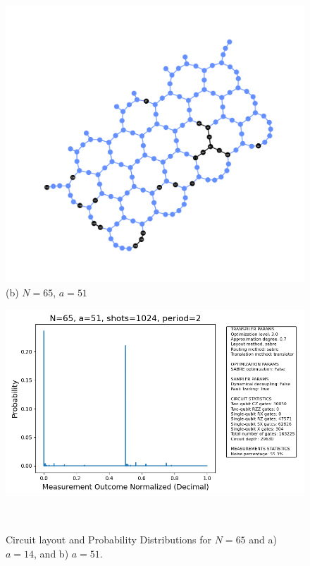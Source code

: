 \documentclass[conference,twoside]{IEEEtran}
\begin{document}
\begin{figure}[!htbp]
\begin{tabular}
\begin{minipage}{0.1\textwidth}
  \centering
  \includegraphics[width=\textwidth]{ibm_aachen_physical_circuit_layout_N65_a51.png} \\
  \small (b) $N=65$, $a=51$
\end{minipage} 
\begin{minipage}{0.3\textwidth}
  \centering
  \includegraphics[width=\textwidth]{prob_dist_N65_a51_backend_ibmqpu.png} \\
\end{minipage} \\
\bottomrule
\end{tabular}
\caption{Circuit layout and Probability Distributions for $N=65$ and a) $a=14$, and b) $a=51$.}
\label{tab:Factoring_N=65}
\end{figure}
\end{document}
